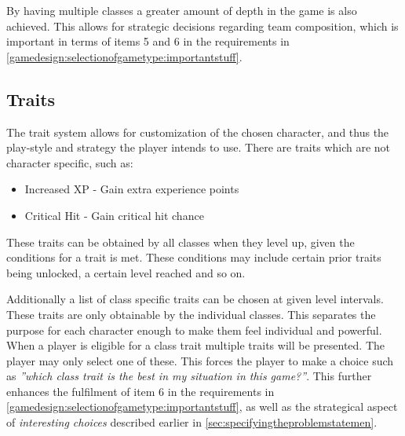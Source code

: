 By having multiple classes a greater amount of depth in the game is also achieved. This allows for strategic decisions regarding team composition, which is important in terms of items 5 and 6 in the requirements in \ref{gamedesign:selectionofgametype:importantstuff}.

\subsection*{Traits}\label{gamedesign:ourgame:traits}
The trait system allows for customization of the chosen character, and thus the play-style and strategy the player intends to use.
There are traits which are not character specific, such as:
\begin{itemize}
\item Increased XP - Gain extra experience points
\item Critical Hit  - Gain critical hit chance
\end{itemize} 
These traits can be obtained by all classes when they level up, given the conditions for a trait is met. These conditions may include certain prior traits being unlocked, a certain level reached and so on.

Additionally a list of class specific traits can be chosen at given level intervals. 
These traits are only obtainable by the individual classes. This separates the purpose for each character enough to make them feel individual and powerful. When a player is eligible for a class trait multiple traits will be presented. The player may only select one of these. This forces the player to make a choice such as \emph{''which class trait is the best in my situation in this game?''}. 
This further enhances the fulfilment of item 6 in the requirements in \ref{gamedesign:selectionofgametype:importantstuff}, as well as the strategical aspect of \emph{interesting choices} described earlier in \ref{sec:specifyingtheproblemstatemen}.

